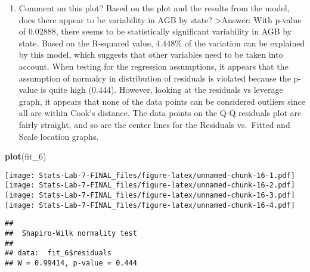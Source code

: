 \documentclass[
]{article}
\newenvironment{Shaded}{\begin{snugshade}}{\end{snugshade}}
\newcommand{\FunctionTok}[1]{\textcolor[rgb]{0.13,0.29,0.53}{\textbf{#1}}}
\newcommand{\NormalTok}[1]{#1}
\newcommand{\SpecialCharTok}[1]{\textcolor[rgb]{0.81,0.36,0.00}{\textbf{#1}}}
\providecommand{\tightlist}{%
  \setlength{\itemsep}{0pt}\setlength{\parskip}{0pt}}
\begin{document}
\begin{enumerate}
\def\labelenumi{\alph{enumi}.}
\setcounter{enumi}{6}
\tightlist
\item
  Comment on this plot? Based on the plot and the results from the
  model, does there appear to be variability in AGB by state?
  \textgreater Answer: With p-value of 0.02888, there seems to be
  statistically significant variability in AGB by state. Based on the
  R-squared value, 4.448\% of the variation can be explained by this
  model, which suggests that other variables need to be taken into
  account. When testing for the regression assumptions, it appears that
  the assumption of normalcy in distribution of residuals is violated
  because the p-value is quite high (0.444). However, looking at the
  residuals vs leverage graph, it appears that none of the data points
  can be considered outliers since all are within Cook's distance. The
  data points on the Q-Q residuals plot are fairly straight, and so are
  the center lines for the Residuals vs.~Fitted and Scale location
  graphs.
\end{enumerate}

\begin{Shaded}
\begin{Highlighting}[]
\FunctionTok{plot}\NormalTok{(fit\_6)}
\end{Highlighting}
\end{Shaded}

\texttt{[image: Stats-Lab-7-FINAL\_files/figure-latex/unnamed-chunk-16-1.pdf]}
\texttt{[image: Stats-Lab-7-FINAL\_files/figure-latex/unnamed-chunk-16-2.pdf]}
\texttt{[image: Stats-Lab-7-FINAL\_files/figure-latex/unnamed-chunk-16-3.pdf]}
\texttt{[image: Stats-Lab-7-FINAL\_files/figure-latex/unnamed-chunk-16-4.pdf]}

\begin{Shaded}
\end{Shaded}

\begin{verbatim}
## 
##  Shapiro-Wilk normality test
## 
## data:  fit_6$residuals
## W = 0.99414, p-value = 0.444
\end{verbatim}
\end{document}
